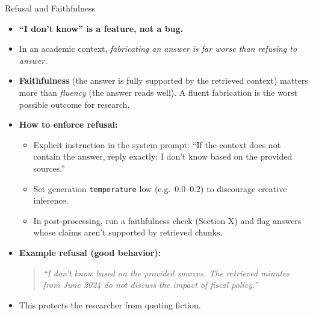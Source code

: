 \documentclass[10pt,english,aspectratio=169]{beamer}
\begin{document}
\begin{frame}{Refusal and Faithfulness}
\begin{itemize}
\item \textbf{``I don't know'' is a feature, not a bug.}

\medskip
\item In an academic context, \emph{fabricating an answer is far worse than refusing to answer.}

\medskip
\item \textbf{Faithfulness} (the answer is fully supported by the retrieved context) matters more than \emph{fluency} (the answer reads well). A fluent fabrication is the worst possible outcome for research.

\medskip
\item \textbf{How to enforce refusal:}
\begin{itemize}
    \item Explicit instruction in the system prompt: ``If the context does not contain the answer, reply exactly: I don't know based on the provided sources.''
    \item Set generation \texttt{temperature} low (e.g.\ 0.0--0.2) to discourage creative inference.
    \item In post-processing, run a faithfulness check (Section X) and flag answers whose claims aren't supported by retrieved chunks.
\end{itemize}

\medskip
\item \textbf{Example refusal (good behavior):}
\begin{quote}
\small\itshape
``I don't know based on the provided sources. The retrieved minutes from June 2024 do not discuss the impact of fiscal policy.''
\end{quote}

\medskip
\item This protects the researcher from quoting fiction.
\end{itemize}
\end{frame}
\end{document}
